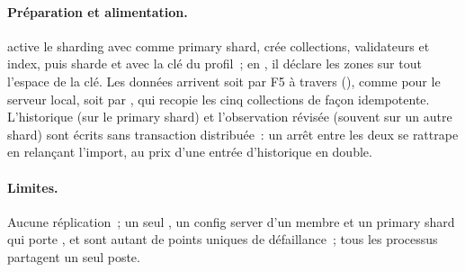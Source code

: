 \paragraph{Préparation et alimentation.}  active le sharding avec  comme primary shard, crée collections, validateurs et index, puis sharde  et  avec la clé du profil~; en , il déclare les zones sur tout l'espace de la clé. Les données arrivent soit par F5 à travers  (), comme pour le serveur local, soit par , qui recopie les cinq collections de façon idempotente. L'historique (sur le primary shard) et l'observation révisée (souvent sur un autre shard) sont écrits sans transaction distribuée~: un arrêt entre les deux se rattrape en relançant l'import, au prix d'une entrée d'historique en double.

\paragraph{Limites.} Aucune réplication~; un seul , un config server d'un membre et un primary shard qui porte ,  et  sont autant de points uniques de défaillance~; tous les processus partagent un seul poste.
